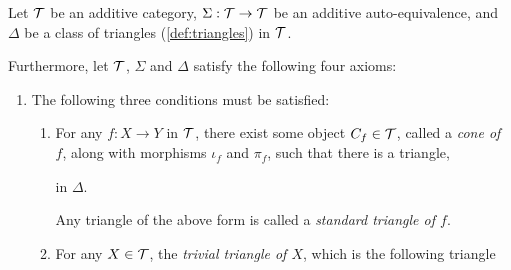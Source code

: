 \begin{definition}
    \label{def:triangulated_category}
    Let \( {\mathcal{T}} \) be an additive category, \( \Sigma: {\mathcal{T}} \to {\mathcal{T}} \) be an additive auto-equivalence, and \( \Delta \) be a class of triangles (\autoref{def:triangles}) in \( {\mathcal{T}} \).

    Furthermore, let \( {\mathcal{T}} \), \( \Sigma \) and \( \Delta \) satisfy the following four axioms:
    \begin{enumerate}[label={(\bfseries TR\arabic*)}]
        \item {
            The following three conditions must be satisfied:
            \begin{enumerate}
                \item {
                    For any \( f: X \to Y \) in \( {\mathcal{T}} \), there exist some object \( C_f \in {\mathcal{T}} \), called a \emph{cone of \( f \)}, along with morphisms \( \iota_f \) and \( \pi_f \), such that there is a triangle,
                    \begin{center}
                    \end{center}
                    in \( \Delta \).

                    Any triangle of the above form is called a \emph{standard triangle of \( f \)}.
                }
                \item {
                    For any \( X \in {\mathcal{T}} \), the \emph{trivial triangle of \( X \)}, which is the following triangle
                    \begin{center}
\end{center}}
\end{enumerate}}
\end{enumerate}
\end{definition}
